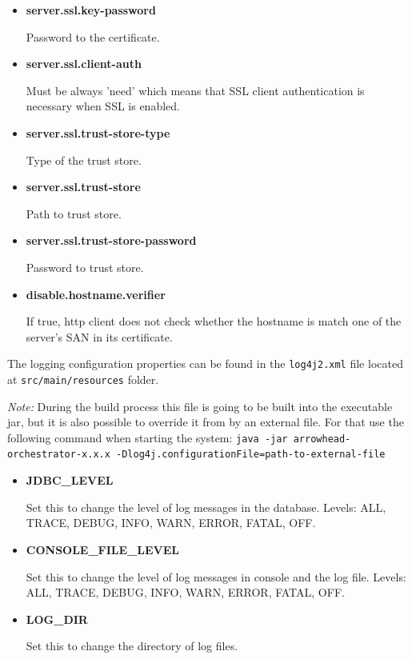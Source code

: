 \documentclass[a4paper]{arrowhead}
\begin{document}
\begin{itemize}
  \item \textbf{server.ssl.key-password}
  
  Password to the certificate.
  
  \item \textbf{server.ssl.client-auth}
  
  Must be always 'need' which means that SSL client authentication is necessary when SSL is enabled.
  
  \item \textbf{server.ssl.trust-store-type}
  
  Type of the trust store.
  
  \item \textbf{server.ssl.trust-store}
  
  Path to trust store.
  
  \item \textbf{server.ssl.trust-store-password}
  
  Password to trust store.
  
  \item \textbf{disable.hostname.verifier}
  
  If true, http client does not check whether the hostname is match one of the server's SAN in its certificate.
  \end{itemize}
  
The logging configuration properties can be found in the \texttt{log4j2.xml} file located at \texttt{src/main/resources} folder.

\textit{Note:} During the build process this file is going to be built into the executable jar, but it is also possible to override it from by an external file. For that use the following command when starting the system: \texttt{java -jar arrowhead-orchestrator-x.x.x -Dlog4j.configurationFile={path-to-external-file}}

\begin{itemize}
    \item \textbf{JDBC\_LEVEL}
    
    Set this to change the level of log messages in the database. Levels: ALL, TRACE, DEBUG, INFO, WARN, ERROR, FATAL, OFF.
    
    \item \textbf{CONSOLE\_FILE\_LEVEL}
    
    Set this to change the level of log messages in console and the log file. Levels: ALL, TRACE, DEBUG, INFO, WARN, ERROR, FATAL, OFF.
    
    \item \textbf{LOG\_DIR}
    
    Set this to change the directory of log files.
\end{itemize}
  
\end{document}
